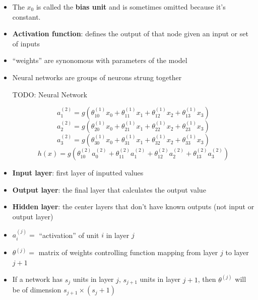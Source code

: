 \begin{itemize}[--]
	\item The $x_0$ is called the \textbf{bias unit} and is sometimes omitted because it's constant.
	\item \textbf{Activation function}: defines the output of that node given an input or set of inputs
	\item ``weights'' are synonomous with parameters of the model
	\item Neural networks are groups of neurons strung together

	TODO: Neural Network

	$$a_1^{(2)}=g(\theta_{10}^{(1)}x_0+\theta_{11}^{(1)}x_1+\theta_{12}^{(1)}x_2+\theta_{13}^{(1)}x_3)$$
	$$a_2^{(2)}=g(\theta_{20}^{(1)}x_0+\theta_{21}^{(1)}x_1+\theta_{22}^{(1)}x_2+\theta_{23}^{(1)}x_3)$$
	$$a_3^{(2)}=g(\theta_{30}^{(1)}x_0+\theta_{31}^{(1)}x_1+\theta_{32}^{(1)}x_2+\theta_{33}^{(1)}x_3)$$
	$$h(x)=g(\theta_{10}^{(2)}a_0^{(2)}+\theta_{11}^{(2)}a_1^{(2)}+\theta_{12}^{(2)}a_2^{(2)}+\theta_{13}^{(2)}a_3^{(2)})$$

	\item \textbf{Input layer}: first layer of inputted values
	\item \textbf{Output layer}: the final layer that calculates the output value
	\item \textbf{Hidden layer}: the center layers that don't have known outputs (not input or output layer)
	\item $a_i^{(j)}=$ ``activation'' of unit $i$ in layer $j$
	\item $\theta^{(j)}=$ matrix of weights controlling function mapping from layer $j$ to layer $j+1$
	\item If a network has $s_j$ units in layer $j$, $s_{j+1}$ units in layer $j+1$, then $\theta^{(j)}$ will be of dimension $s_{j+1}\times (s_j + 1)$
\end{itemize}

